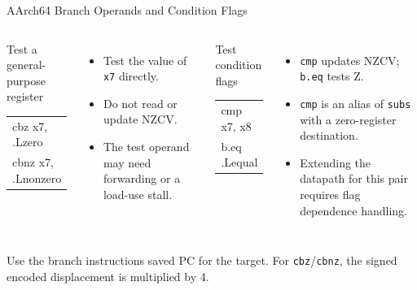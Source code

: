 \documentclass[aspectratio=169,11pt,t]{beamer}
\newcommand{\code}[1]{\texttt{#1}}
\begin{document}
\begin{frame}{AArch64 Branch Operands and Condition Flags}

\begin{columns}[T,onlytextwidth]
\begin{block}{Test a general-purpose register}
\ttfamily\small
\begin{tabular}{@{}l@{}}
cbz  x7, .Lzero \\
cbnz x7, .Lnonzero
\end{tabular}
\end{block}

\begin{itemize}\setlength{\itemsep}{6pt}
  \item Test the value of \code{x7} directly.
  \item Do not read or update NZCV.
  \item The test operand may need forwarding or a load-use stall.
\end{itemize}

\begin{block}{Test condition flags}
\ttfamily\small
\begin{tabular}{@{}l@{}}
cmp  x7, x8 \\
b.eq .Lequal
\end{tabular}
\end{block}

\begin{itemize}\setlength{\itemsep}{6pt}
  \item \code{cmp} updates NZCV; \code{b.eq} tests Z.
  \item \code{cmp} is an alias of \code{subs} with a zero-register destination.
  \item Extending the datapath for this pair requires flag dependence handling.
\end{itemize}

\end{columns}
\vspace{.18cm}
Use the branch instruction\textquotesingle s saved PC for the target. For \code{cbz}/\code{cbnz}, the signed encoded displacement is multiplied by 4.

\end{frame}
\end{document}
